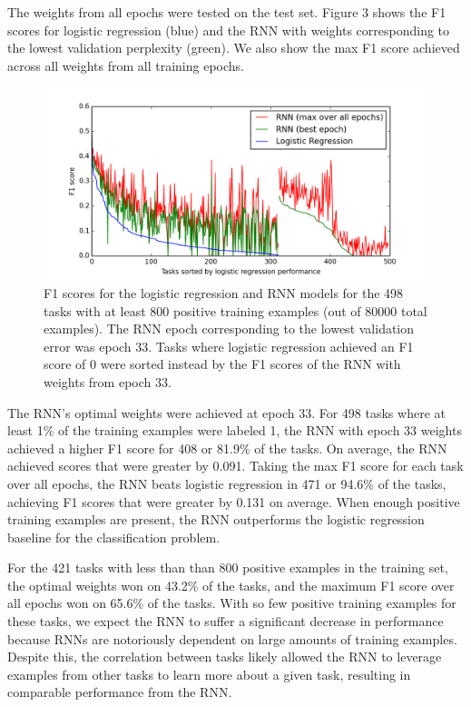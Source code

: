 \documentclass{article} %
\begin{document}
The weights from all epochs were tested on the test set. Figure 3 shows the F1 scores for logistic regression (blue) and the RNN with weights corresponding to the lowest validation perplexity (green). We also show the max F1 score achieved across all weights from all training epochs.

\begin{figure}[!htb]
	\centering
	\includegraphics[scale=0.6]{F1_scores_498}
	\caption{F1 scores for the logistic regression and RNN models for the 498 tasks with at least 800 positive training examples (out of 80000 total examples). The RNN epoch corresponding to the lowest validation error was epoch 33. Tasks where logistic regression achieved an F1 score of 0 were sorted instead by the F1 scores of the RNN with weights from epoch 33.}
\end{figure}

The RNN's optimal weights were achieved at epoch 33. For 498 tasks where at least 1\% of the training examples were labeled 1, the RNN with epoch 33 weights achieved a higher F1 score for 408 or 81.9\% of the tasks. On average, the RNN achieved scores that were greater by 0.091. Taking the max F1 score for each task over all epochs, the RNN beats logistic regression in 471 or 94.6\% of the tasks, achieving F1 scores that were greater by 0.131 on average. When enough positive training examples are present, the RNN outperforms the logistic regression baseline for the classification problem.

For the 421 tasks with less than than 800 positive examples in the training set, the optimal weights won on 43.2\% of the tasks, and the maximum F1 score over all epochs won on 65.6\% of the tasks. With so few positive training examples for these tasks, we expect the RNN to suffer a significant decrease in performance because RNNs are notoriously dependent on large amounts of training examples. Despite this, the correlation between tasks likely allowed the RNN to leverage examples from other tasks to learn more about a given task, resulting in comparable performance from the RNN.
\end{document}
